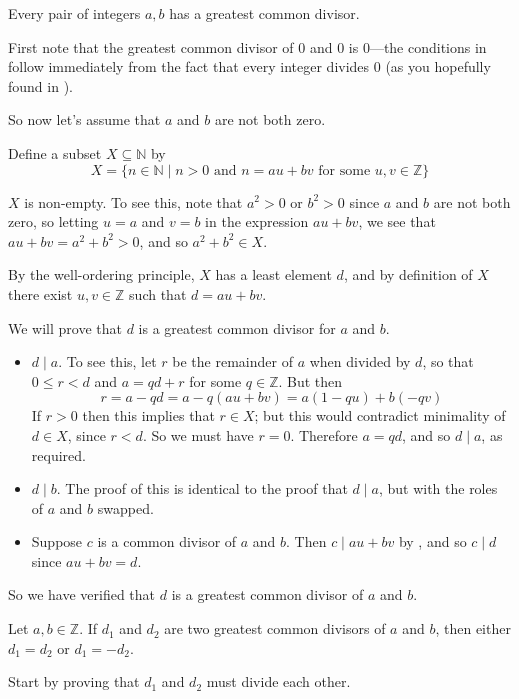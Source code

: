 \begin{theorem}
\label{thmGCDsExist}
Every pair of integers $a,b$ has a greatest common divisor.
\end{theorem}
\begin{cproof}
First note that the greatest common divisor of $0$ and $0$ is $0$---the conditions in  follow immediately from the fact that every integer divides $0$ (as you hopefully found in ).

So now let's assume that $a$ and $b$ are not both zero.

Define a subset $X \subseteq \mathbb{N}$ by
\[ X = \{ n \in \mathbb{N} \mid n > 0 \text{ and } n = au+bv \text{ for some } u,v \in \mathbb{Z} \} \]

$X$ is non-empty. To see this, note that $a^2 > 0$ or $b^2 > 0$ since $a$ and $b$ are not both zero, so letting $u=a$ and $v=b$ in the expression $au+bv$, we see that $au+bv=a^2+b^2>0$, and so $a^2+b^2 \in X$.

By the well-ordering principle, $X$ has a least element $d$, and by definition of $X$ there exist $u,v \in \mathbb{Z}$ such that $d = au+bv$.

We will prove that $d$ is a greatest common divisor for $a$ and $b$.
\begin{itemize}
\item $d \mid a$. To see this, let $r$ be the remainder of $a$ when divided by $d$, so that $0 \le r < d$ and $a=qd+r$ for some $q \in \mathbb{Z}$. But then
\[ r = a-qd = a-q(au+bv) = a(1-qu) + b(-qv) \]
If $r>0$ then this implies that $r \in X$; but this would contradict minimality of $d \in X$, since $r < d$. So we must have $r=0$. Therefore $a = qd$, and so $d \mid a$, as required.
\item $d \mid b$. The proof of this is identical to the proof that $d \mid a$, but with the roles of $a$ and $b$ swapped.
\item Suppose $c$ is a common divisor of $a$ and $b$. Then $c \mid au+bv$ by , and so $c \mid d$ since $au+bv=d$.
\end{itemize}
So we have verified that $d$ is a greatest common divisor of $a$ and $b$.
\end{cproof}

\begin{exercise}
\label{exGCDUnique}
Let $a,b \in \mathbb{Z}$. If $d_1$ and $d_2$ are two greatest common divisors of $a$ and $b$, then either $d_1=d_2$ or $d_1=-d_2$.
\begin{backhint}
Start by proving that $d_1$ and $d_2$ must divide each other.
\end{backhint}
\end{exercise}

